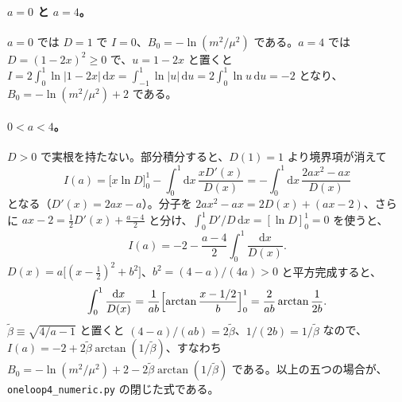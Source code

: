 \documentclass[a4paper,10pt]{ltjsarticle}
\newcommand{\dd}{\mathrm{d}}
\begin{document}
\paragraph{$a=0$ と $a=4$。}$a=0$ では $D=1$ で $I=0$、$B_0=-\ln(m^2/\mu^2)$ である。$a=4$ では $D=(1-2x)^2\ge0$ で、$u=1-2x$ と置くと $I=2\int_0^1\ln|1-2x|\,\dd x=\int_{-1}^{1}\ln|u|\,\dd u=2\int_0^1\ln u\,\dd u=-2$ となり、$B_0=-\ln(m^2/\mu^2)+2$ である。

\paragraph{$0<a<4$。}$D>0$ で実根を持たない。部分積分すると、$D(1)=1$ より境界項が消えて
\begin{equation*}
I(a)=\bigl[x\ln D\bigr]_0^1-\int_0^1\dd x\,\frac{xD'(x)}{D(x)}=-\int_0^1\dd x\,\frac{2ax^2-ax}{D(x)}
\end{equation*}
となる（$D'(x)=2ax-a$）。分子を $2ax^2-ax=2D(x)+(ax-2)$、さらに $ax-2=\tfrac12D'(x)+\tfrac{a-4}{2}$ と分け、$\int_0^1D'/D\,\dd x=[\ln D]_0^1=0$ を使うと、
\begin{equation*}
I(a)=-2-\frac{a-4}{2}\int_0^1\frac{\dd x}{D(x)} .
\end{equation*}
$D(x)=a\bigl[(x-\tfrac12)^2+b^2\bigr]$、$b^2=(4-a)/(4a)>0$ と平方完成すると、
\begin{equation*}
\int_0^1\frac{\dd x}{D(x)}=\frac{1}{ab}\Bigl[\arctan\frac{x-1/2}{b}\Bigr]_0^1=\frac{2}{ab}\arctan\frac{1}{2b}.
\end{equation*}
$\tilde\beta\equiv\sqrt{4/a-1}$ と置くと $(4-a)/(ab)=2\tilde\beta$、$1/(2b)=1/\tilde\beta$ なので、$I(a)=-2+2\tilde\beta\arctan(1/\tilde\beta)$、すなわち $B_0=-\ln(m^2/\mu^2)+2-2\tilde\beta\arctan(1/\tilde\beta)$ である。以上の五つの場合が、\texttt{oneloop4\_numeric.py} の閉じた式である。
\end{document}
